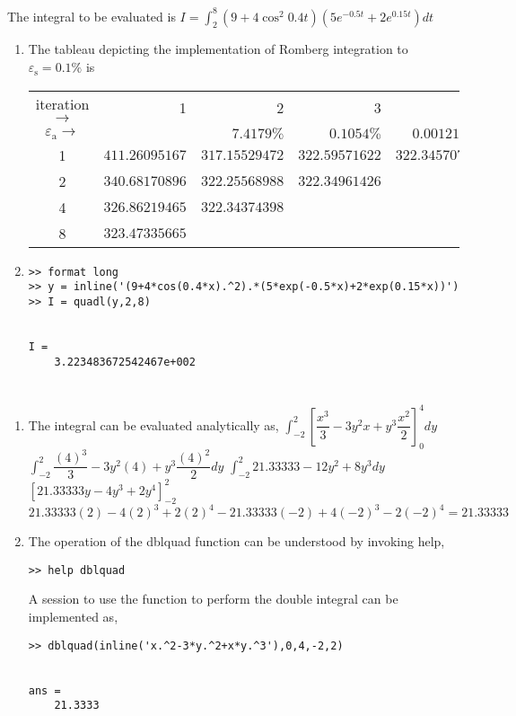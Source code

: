 \documentclass[../main.tex]{subfiles}
\begin{document}
\section{}
The integral to be evaluated is
	\bigbreak
$\displaystyle I=\int_{2}^{8}\left(9+4 \cos ^{2} 0.4 t\right)\left(5 e^{-0.5 t}+2 e^{0.15 t}\right) d t$
	\bigbreak
\begin{enumerate}[label=\bfseries(\alph*)]
\item The tableau depicting the implementation of Romberg integration to $\varepsilon_{\mathrm{s}}=0.1 \%$ is
	\bigbreak
\begin{tabular}{crrrr}
\multicolumn{1}{c}{iteration $\rightarrow$} & 1 & 2 & 3 & 4 \\
$\varepsilon_{\mathrm{a}} \rightarrow$ &  & $7.4179 \%$ & $0.1054 \%$ & $0.001212 \%$ \\
\multicolumn{1}{c}{1} & $411.26095167$ & $317.15529472$ & $322.59571622$ & $322.34570788$ \\
\multicolumn{1}{c}{2} & $340.68170896$ & $322.25568988$ & $322.34961426$ &  \\
\multicolumn{1}{c}{4} & $326.86219465$ & $322.34374398$ &  &  \\
\multicolumn{1}{c}{8} & $323.47335665$ &  &  &  \\
\end{tabular}
	\bigbreak
\item
\begin{lstlisting}[numbers=none]
>> format long
>> y = inline('(9+4*cos(0.4*x).^2).*(5*exp(-0.5*x)+2*exp(0.15*x))')
>> I = quadl(y,2,8)


I =
	3.223483672542467e+002 
\end{lstlisting}
\end{enumerate}
	\bigbreak



\section{}
\begin{enumerate}[label=\bfseries(\alph*)]
\item The integral can be evaluated analytically as,
	\bigbreak
$\displaystyle\int_{-2}^{2}\left[\dfrac{x^{3}}{3}-3 y^{2} x+y^{3} \dfrac{x^{2}}{2}\right]_{0}^{4} d y$
	\bigbreak
$\displaystyle\int_{-2}^{2} \dfrac{(4)^{3}}{3}-3 y^{2}(4)+y^{3} \dfrac{(4)^{2}}{2} d y$
	\bigbreak
$\displaystyle\int_{-2}^{2} 21.33333-12 y^{2}+8 y^{3} d y$
	\bigbreak
$\displaystyle\left[21.33333 y-4 y^{3}+2 y^{4}\right]_{-2}^{2}$
	\bigbreak
$21.33333(2)-4(2)^{3}+2(2)^{4}-21.33333(-2)+4(-2)^{3}-2(-2)^{4}=21.33333$
	\bigbreak
\item  The operation of the dblquad function can be understood by invoking help,
	\bigbreak
\begin{lstlisting}[numbers=none]
>> help dblquad
\end{lstlisting}
	\bigbreak
A session to use the function to perform the double integral can be implemented as,
	\bigbreak
\begin{lstlisting}[numbers=none]
>> dblquad(inline('x.^2-3*y.^2+x*y.^3'),0,4,-2,2)


ans =
	21.3333 
\end{lstlisting}
\end{enumerate}
\end{document}
